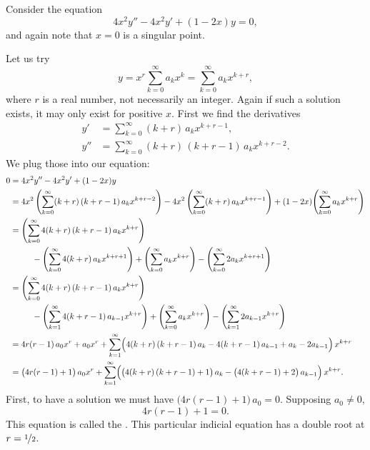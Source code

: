 \begin{example}
Consider the equation
\begin{equation*}
4 x^2 y'' - 4 x^2 y' + (1-2x)y = 0,
\end{equation*}
and again note that $x=0$ is a singular point.

Let us try
\begin{equation*}
y = x^r \sum_{k=0}^\infty a_k x^k
= \sum_{k=0}^\infty a_k x^{k+r} ,
\end{equation*}
where $r$ is a real number, not necessarily an integer.
Again if such a solution exists, it may only exist for positive $x$.
First we find the derivatives
\begin{align*}
y' & = \sum_{k=0}^\infty (k+r)\, a_k x^{k+r-1} , \\
y'' & = \sum_{k=0}^\infty (k+r)\,(k+r-1)\, a_k x^{k+r-2} .
\end{align*}
We plug those into our equation:
\begin{equation*}
\begin{split}
0 & = 4x^2y''-4x^2y'+(1-2x)y
\\
&= 
4x^2 \, \Biggl( \sum_{k=0}^\infty (k+r)\,(k+r-1) \, a_k x^{k+r-2}  \Biggr)
-
4x^2 \, \Biggl( \sum_{k=0}^\infty (k+r) \, a_k x^{k+r-1}  \Biggr)
+
(1-2x)
\Biggl( \sum_{k=0}^\infty a_k x^{k+r} \Biggr)
\\
&=
\Biggl( \sum_{k=0}^\infty 4 (k+r)\,(k+r-1) \, a_k x^{k+r}  \Biggr)
\\
& \phantom{mmm}
-
\Biggl( \sum_{k=0}^\infty 4 (k+r) \, a_k x^{k+r+1}  \Biggr)
+
\Biggl( \sum_{k=0}^\infty a_k x^{k+r} \Biggr)
-
\Biggl( \sum_{k=0}^\infty 2a_k x^{k+r+1} \Biggr)
\\
&=
\Biggl( \sum_{k=0}^\infty 4 (k+r)\,(k+r-1) \, a_k x^{k+r}  \Biggr)
\\
& \phantom{mmm}
-
\Biggl( \sum_{k=1}^\infty 4 (k+r-1) \, a_{k-1} x^{k+r}  \Biggr)
+
\Biggl( \sum_{k=0}^\infty a_k x^{k+r} \Biggr)
-
\Biggl( \sum_{k=1}^\infty 2a_{k-1} x^{k+r} \Biggr)
\\
&=
4r(r-1) \, a_0 x^r  + a_0 x^r
+ 
\sum_{k=1}^\infty
\Bigl( 4 (k+r)\,(k+r-1) \, a_k
-
4 (k+r-1) \, a_{k-1}
+
a_k
-
2a_{k-1} \Bigr) \, x^{k+r} 
\\
&=
\bigl( 4r(r-1) + 1 \bigr) \, a_0 x^r
+ 
\sum_{k=1}^\infty
\Bigl( \bigl( 4 (k+r)\,(k+r-1) + 1 \bigr) \, a_k
-
\bigl( 4 (k+r-1) + 2 \bigr) \, a_{k-1} \Bigr) \, x^{k+r} .
\end{split}
\end{equation*}
First, to have a solution we must have
$\bigl( 4r(r-1) + 1 \bigr) \, a_0 = 0$.  Supposing $a_0 \neq 0$,
\begin{equation*}
4r(r-1) + 1 = 0 .
\end{equation*}
This equation is called the \emph{}.
This particular indicial
equation has a double root at $r = \nicefrac{1}{2}$.


\end{example}

